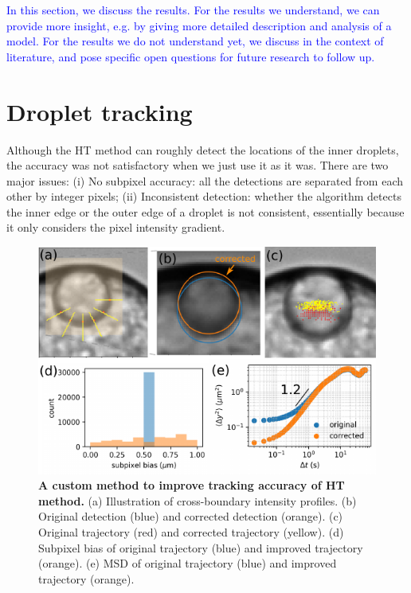 \documentclass[%
10pt,
superscriptaddress,
twocolumn,
 amsmath,amssymb,
 aps,prx,
]{revtex4-2}
\begin{document}
\textcolor{blue}{
  In this section, we discuss the results. 
  For the results we understand, we can provide more insight, e.g. by giving more detailed description and analysis of a model. 
  For the results we do not understand yet, we discuss in the context of literature, and pose specific open questions for future research to follow up.
}

\appendix

\section{Droplet tracking}

Although the HT method can roughly detect the locations of the inner droplets, the accuracy was not satisfactory when we just use it as it was. 
There are two major issues: 
(i) No subpixel accuracy: all the detections are separated from each other by integer pixels; (ii) Inconsistent detection: whether the algorithm detects the inner edge or the outer edge of a droplet is not consistent, essentially because it only considers the pixel intensity gradient.

\begin{figure}[!t]
  \includegraphics[width=\columnwidth]{hc-correction}
  \caption{
  \textbf{A custom method to improve tracking accuracy of HT method.}
  (a) Illustration of cross-boundary intensity profiles.
  (b) Original detection (blue) and corrected detection (orange).
  (c) Original trajectory (red) and corrected trajectory (yellow).
  (d) Subpixel bias of original trajectory (blue) and improved trajectory (orange).
  (e) MSD of original trajectory (blue) and improved trajectory (orange).
  }
  \label{fig:hc-correction}
\end{figure}
\end{document}
